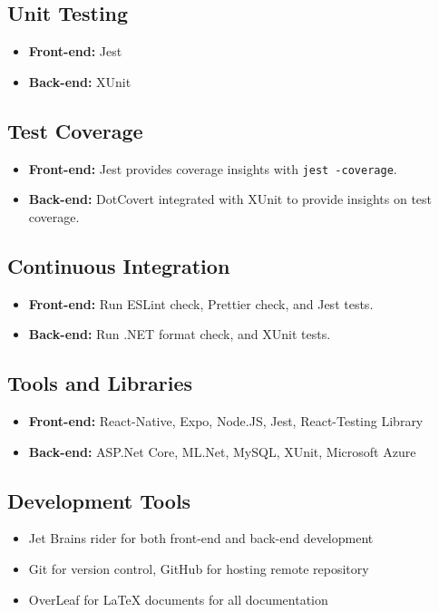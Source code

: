 \documentclass{article}
\begin{document}
	\subsection{Unit Testing}
    \begin{itemize}
		\item \textbf{Front-end:} Jest
		\item \textbf{Back-end:} XUnit
	\end{itemize}

	\subsection{Test Coverage}
    \begin{itemize}
		\item \textbf{Front-end:} Jest provides coverage insights with \texttt{jest -coverage}.
		\item \textbf{Back-end:} DotCovert integrated with XUnit to provide insights on test coverage.
	\end{itemize}

	\subsection{Continuous Integration}
    \begin{itemize}
		\item \textbf{Front-end:} Run ESLint check, Prettier check, and Jest tests.
		\item \textbf{Back-end:} Run .NET format check, and XUnit tests.
	\end{itemize}

	\subsection{Tools and Libraries}
    \begin{itemize}
		\item \textbf{Front-end:} React-Native, Expo, Node.JS, Jest, React-Testing Library
		\item \textbf{Back-end:} ASP.Net Core, ML.Net, MySQL, XUnit, Microsoft Azure
	\end{itemize}

	\subsection{Development Tools}
	\begin{itemize}
		\item Jet Brains rider for both front-end and back-end development
		\item Git for version control, GitHub for hosting remote repository
		\item OverLeaf for LaTeX documents for all documentation
	\end{itemize}
\end{document}
